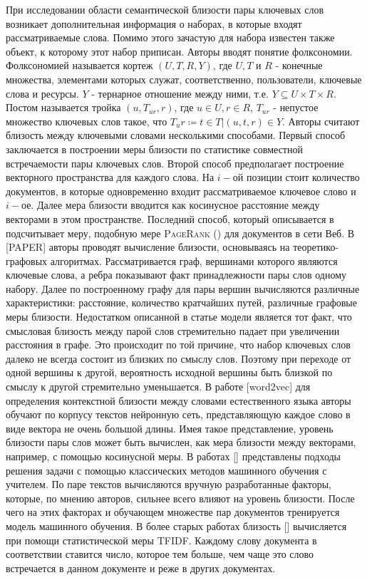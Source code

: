При исследовании области семантической близости пары ключевых слов возникает дополнительная информация о наборах, в которые входят рассматриваемые слова. Помимо этого зачастую для набора известен также объект, к которому этот набор приписан. Авторы \cite{folk} вводят понятие фолксономии. Фолксономией называется кортеж $(U, T, R, Y)$, где $U,T$ и $R$ - конечные множества, элементами которых служат, соответственно, пользователи, ключевые слова и ресурсы. $Y$ - тернарное отношение между ними, т.е. $Y  \subseteq U \times T \times R$. Постом называется тройка $(u, T_{ur}, r)$, где $u \in U, r \in R$, $T_{ur}$ - непустое множество ключевых слов такое, что $T_ur  \coloneqq {t \in T | (u, t, r) \in Y}$. Авторы \cite{folk_2} считают близость между ключевыми словами несколькими способами. Первый способ заключается в построении меры близости по статистике совместной встречаемости пары ключевых слов. Второй способ предполагает построение векторного пространства для каждого слова. На $i-$ой позиции стоит количество документов, в которые одновременно входит рассматриваемое ключевое слово и $i-$ое. Далее мера близости вводится как косинусное расстояние между векторами в этом пространстве. Последний способ, который описывается в \cite{folk} подсчитывает меру, подобную мере \textsc{PageRank} (\cite{pagerank}) для документов в сети Веб.
   В [PAPER] авторы проводят вычисление близости, основываясь на теоретико-графовых алгоритмах. Рассматривается граф, вершинами которого являются ключевые слова, а ребра показывают факт принадлежности пары слов одному набору. Далее по построенному графу для пары вершин  вычисляются различные характеристики: расстояние, количество кратчайших путей, различные графовые меры близости. Недостатком описанной в статье модели является тот факт, что смысловая близость между парой слов стремительно падает при увеличении расстояния в графе. Это происходит по той причине, что набор ключевых слов далеко не всегда состоит из близких по смыслу слов. Поэтому при переходе от одной вершины к другой, вероятность исходной вершины быть близкой по смыслу к другой стремительно уменьшается. В работе [word2vec] для определения контекстной близости между словами естественного языка авторы обучают по корпусу текстов нейронную сеть, представляющую каждое слово в виде вектора не очень большой длины. Имея такое представление, уровень близости пары слов может быть вычислен, как мера близости между векторами, например, с помощью косинусной меры. В работах [] представлены подходы решения задачи с помощью классических методов машинного обучения с учителем. По паре текстов вычисляются вручную разработанные факторы, которые, по мнению авторов, сильнее всего влияют на уровень близости. После чего на этих факторах и обучающем множестве пар документов тренируется модель машинного обучения. В более старых работах близость [] вычисляется при помощи статистической меры TFIDF. Каждому слову документа в соответствии ставится число, которое тем больше, чем чаще это слово встречается в данном документе и реже в других документах. 


